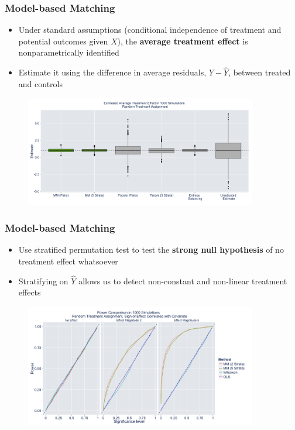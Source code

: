\documentclass{beamer}
\begin{document}
\frame
{
  \frametitle{Model-based Matching}
\begin{center}
\begin{itemize}
\item Under standard assumptions (conditional independence of treatment and potential outcomes given $X$), the \textbf{average treatment effect} is nonparametrically identified
\item Estimate it using the difference in average residuals, $Y - \hat{Y}$, between treated and controls
\end{itemize}

\begin{figure}[htbp]
\begin{center}
\includegraphics[width = 0.9\textwidth]{fig/estimates.png}

\end{center}
\end{figure}


\end{center}
}

\frame
{
  \frametitle{Model-based Matching}
\begin{center}
\begin{itemize}
\item Use stratified permutation test to test the \textbf{strong null hypothesis} of no treatment effect whatsoever
\item Stratifying on $\hat{Y}$ allows us to detect non-constant and non-linear treatment effects
\end{itemize}

\begin{figure}[htbp]
\begin{center}
\includegraphics[width = 0.9\textwidth]{fig/power.png}
\end{center}
\end{figure}


\end{center}
}
\end{document}
